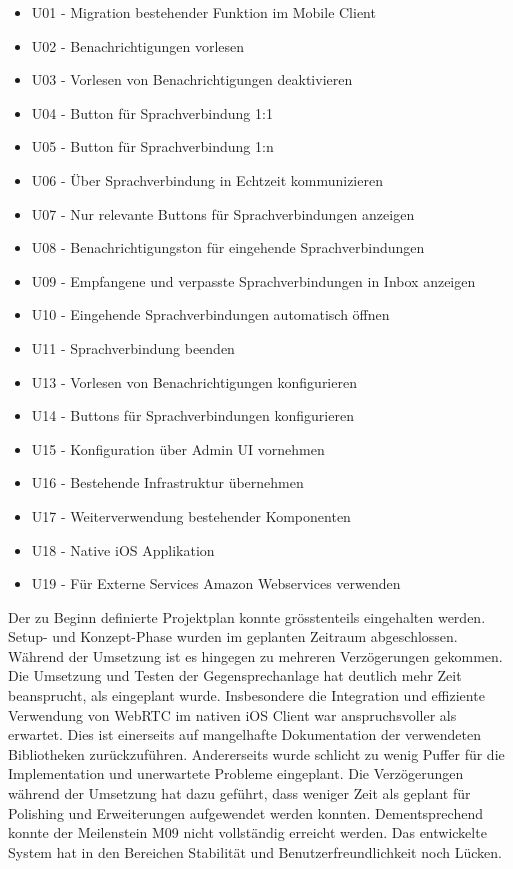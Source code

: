 \begin{itemize}
    \item U01 - Migration bestehender Funktion im Mobile Client
    \item U02 - Benachrichtigungen vorlesen
    \item U03 - Vorlesen von Benachrichtigungen deaktivieren
    \item U04 - Button für Sprachverbindung 1:1
    \item U05 - Button für Sprachverbindung 1:n
    \item U06 - Über Sprachverbindung in Echtzeit kommunizieren
    \item U07 - Nur relevante Buttons für Sprachverbindungen anzeigen
    \item U08 - Benachrichtigungston für eingehende Sprachverbindungen
    \item U09 - Empfangene und verpasste Sprachverbindungen in Inbox anzeigen
    \item U10 - Eingehende Sprachverbindungen automatisch öffnen
    \item U11 - Sprachverbindung beenden
    \item U13 - Vorlesen von Benachrichtigungen konfigurieren
    \item U14 - Buttons für Sprachverbindungen konfigurieren
    \item U15 - Konfiguration über Admin UI vornehmen
    \item U16 - Bestehende Infrastruktur übernehmen
    \item U17 - Weiterverwendung bestehender Komponenten
    \item U18 - Native iOS Applikation
    \item U19 - Für Externe Services Amazon Webservices verwenden
\end{itemize}

Der zu Beginn definierte Projektplan konnte grösstenteils eingehalten werden.
Setup- und Konzept-Phase wurden im geplanten Zeitraum abgeschlossen.
Während der Umsetzung ist es hingegen zu mehreren Verzögerungen gekommen.
Die Umsetzung und Testen der Gegensprechanlage hat deutlich mehr Zeit beansprucht, als eingeplant wurde.
Insbesondere die Integration und effiziente Verwendung von WebRTC im nativen iOS Client war anspruchsvoller als erwartet.
Dies ist einerseits auf mangelhafte Dokumentation der verwendeten Bibliotheken zurückzuführen.
Andererseits wurde schlicht zu wenig Puffer für die Implementation und unerwartete Probleme eingeplant.
Die Verzögerungen während der Umsetzung hat dazu geführt, dass weniger Zeit als geplant für Polishing und Erweiterungen aufgewendet werden konnten.
Dementsprechend konnte der Meilenstein M09 nicht vollständig erreicht werden.
Das entwickelte System hat in den Bereichen Stabilität und Benutzerfreundlichkeit noch Lücken.

